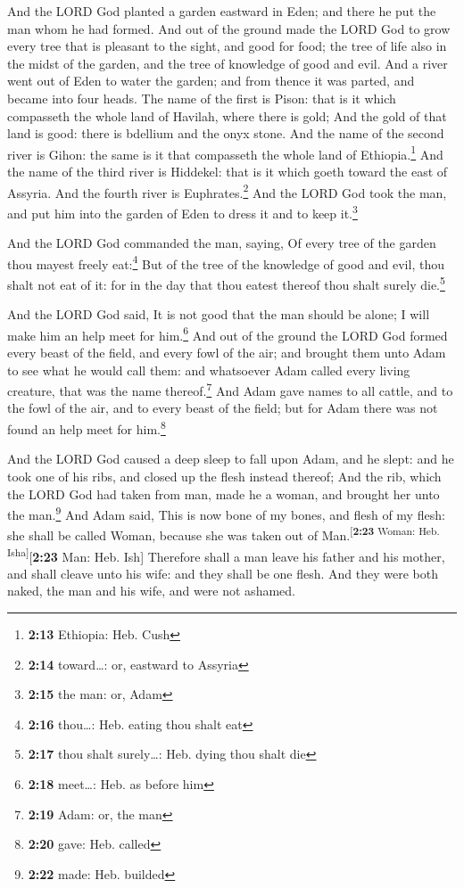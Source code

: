  And the LORD God planted a garden eastward in Eden; and
there he put the man whom he had formed.  And out of the
ground made the LORD God to grow every tree that is pleasant to the
sight, and good for food; the tree of life also in the midst of the
garden, and the tree of knowledge of good and evil.  And
a river went out of Eden to water the garden; and from thence it was
parted, and became into four heads.  The name of the
first is Pison: that is it which compasseth the whole land of Havilah,
where there is gold;  And the gold of that land is good:
there is bdellium and the onyx stone.  And the name of
the second river is Gihon: the same is it that compasseth the whole land
of Ethiopia.\footnote{\textbf{2:13} Ethiopia: Heb. Cush} 
And the name of the third river is Hiddekel: that is it which goeth
toward the east of Assyria. And the fourth river is
Euphrates.\footnote{\textbf{2:14} toward\ldots: or, eastward to Assyria}
 And the LORD God took the man, and put him into the
garden of Eden to dress it and to keep it.\footnote{\textbf{2:15} the
  man: or, Adam}

 And the LORD God commanded the man, saying, Of every
tree of the garden thou mayest freely eat:\footnote{\textbf{2:16}
  thou\ldots: Heb. eating thou shalt eat}  But of the
tree of the knowledge of good and evil, thou shalt not eat of it: for in
the day that thou eatest thereof thou shalt surely die.\footnote{\textbf{2:17}
  thou shalt surely\ldots: Heb. dying thou shalt die}

 And the LORD God said, It is not good that the man
should be alone; I will make him an help meet for him.\footnote{\textbf{2:18}
  meet\ldots: Heb. as before him}  And out of the ground
the LORD God formed every beast of the field, and every fowl of the air;
and brought them unto Adam to see what he would call them: and
whatsoever Adam called every living creature, that was the name
thereof.\footnote{\textbf{2:19} Adam: or, the man}  And
Adam gave names to all cattle, and to the fowl of the air, and to every
beast of the field; but for Adam there was not found an help meet for
him.\footnote{\textbf{2:20} gave: Heb. called}

 And the LORD God caused a deep sleep to fall upon Adam,
and he slept: and he took one of his ribs, and closed up the flesh
instead thereof;  And the rib, which the LORD God had
taken from man, made he a woman, and brought her unto the
man.\footnote{\textbf{2:22} made: Heb. builded}  And Adam
said, This is now bone of my bones, and flesh of my flesh: she shall be
called Woman, because she was taken out of
Man.\textsuperscript{{[}\textbf{2:23} Woman: Heb.
Isha{]}}{[}\textbf{2:23} Man: Heb. Ish{]}  Therefore
shall a man leave his father and his mother, and shall cleave unto his
wife: and they shall be one flesh.  And they were both
naked, the man and his wife, and were not ashamed.

